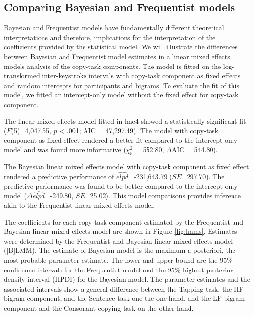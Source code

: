 \clearpage
\makeatletter
\efloat@restorefloats
\makeatother


\begin{appendix}
\hypertarget{comparing-bayesian-and-frequentist-models}{%
\section{Comparing Bayesian and Frequentist
models}\label{comparing-bayesian-and-frequentist-models}}

Bayesian and Frequentist models have fundamentally different theoretical
interpretations and therefore, implications for the interpretation of
the coefficients provided by the statistical model. We will illustrate
the differences between Bayesian and Frequentist model estimates in a
linear mixed effects models analysis of the copy-task components. The
model is fitted on the log-transformed inter-keystroke intervals with
copy-task component as fixed effects and random intercepts for
participants and bigrams. To evaluate the fit of this model, we fitted
an intercept-only model without the fixed effect for copy-task
component.

The linear mixed effects model fitted in lme4 showed a statistically
significant fit (\(F\)(5)=4,047.55, \(p\) \textless{} .001; AIC =
47,297.49). The model with copy-task component as fixed effect rendered
a better fit compared to the intercept-only model and was found more
informative (\(\chi^2_5\) = 552.80, \(\Delta\)AIC = 544.80).

The Bayesian linear mixed effects model with copy-task component as
fixed effect rendered a predictive performance of
\(\widehat{elpd}\)=-231,643.79 (\(SE\)=297.70). The predictive
performance was found to be better compared to the intercept-only model
(\(\Delta\widehat{elpd}\)=-249.80, \(SE\)=25.02). This model comparisons
provides inference akin to the Frequentist linear mixed effects model.

The coefficients for each copy-task component estimated by the
Frequentist and Bayesian linear mixed effects model are shown in Figure
\ref{fig:lmms}. Estimates were determined by the Frequentist and
Bayesian linear mixed effects model ({[}B{]}LMM). The estimate of
Bayesian model is the maximum a posteriori, the most probable parameter
estimate. The lower and upper bound are the 95\% confidence intervals
for the Frequentist model and the 95\% highest posterior density
interval (HPDI) for the Bayesian model. The parameter estimates and the
associated intervals show a general difference between the Tapping task,
the HF bigram component, and the Sentence task one the one hand, and the
LF bigram component and the Consonant copying task on the other hand.


\end{appendix}
